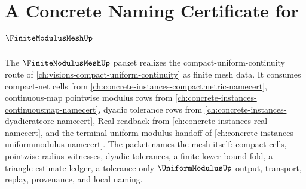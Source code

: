 \chapter{A Concrete Naming Certificate for $\FiniteModulusMeshUp$}
\label{ch:concrete-instances-finite-modulus-mesh-namecert}

The $\FiniteModulusMeshUp$ packet realizes the compact-uniform-continuity route of \autoref{ch:visions-compact-uniform-continuity} as finite mesh data. It consumes compact-net cells from \autoref{ch:concrete-instances-compactmetric-namecert}, continuous-map pointwise modulus rows from \autoref{ch:concrete-instances-continuousmap-namecert}, dyadic tolerance rows from \autoref{ch:concrete-instances-dyadicratcore-namecert}, Real readback from \autoref{ch:concrete-instances-real-namecert}, and the terminal uniform-modulus handoff of \autoref{ch:concrete-instances-uniformmodulus-namecert}. The packet names the mesh itself: compact cells, pointwise-radius witnesses, dyadic tolerances, a finite lower-bound fold, a triangle-estimate ledger, a tolerance-only $\UniformModulusUp$ output, transport, replay, provenance, and local naming.

